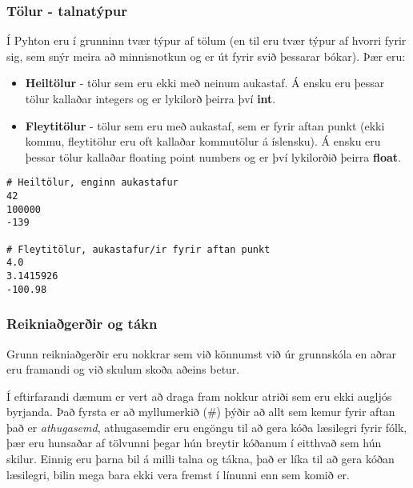 \documentclass[11pt,fleqn]{book} %
\begin{document}
\subsubsection{Tölur - talnatýpur}
Í Pyhton eru í grunninn tvær týpur af tölum (en til eru tvær týpur af hvorri fyrir sig, sem snýr meira að minnisnotkun og er út fyrir svið þessarar bókar). 
Þær eru:

\begin{itemize}
	\item \textbf{Heiltölur} - tölur sem eru ekki með neinum aukastaf. 
	Á ensku eru þessar tölur kallaðar integers og er lykilorð þeirra því \textbf{int}.
	\item \textbf{Fleytitölur} - tölur sem eru með aukastaf, sem er fyrir aftan punkt (ekki kommu, fleytitölur eru oft kallaðar kommutölur á íslensku). 
	Á ensku eru þessar tölur kallaðar floating point numbers og er því lykilorðið þeirra \textbf{float}.
\end{itemize}

\begin{lstlisting}[caption=Heiltölur og fleytitölur]
# Heiltölur, enginn aukastafur
42
100000
-139

# Fleytitölur, aukastafur/ir fyrir aftan punkt
4.0
3.1415926
-100.98
\end{lstlisting}

\subsubsection{Reikniaðgerðir og tákn}
Grunn reikniaðgerðir eru nokkrar sem við könnumst við úr grunnskóla en aðrar eru framandi og við skulum skoða aðeins betur.

Í eftirfarandi dæmum er vert að draga fram nokkur atriði sem eru ekki augljós byrjanda. 
Það fyrsta er að myllumerkið (\#) þýðir að allt sem kemur fyrir aftan það er \textit{athugasemd}, athugasemdir eru engöngu til að gera kóða læsilegri fyrir fólk, þær eru hunsaðar af tölvunni þegar hún breytir kóðanum í eitthvað sem hún skilur. 
Einnig eru þarna bil á milli talna og tákna, það er líka til að gera kóðan læsilegri, bilin mega bara ekki vera fremst í línunni enn sem komið er.
\end{document}
